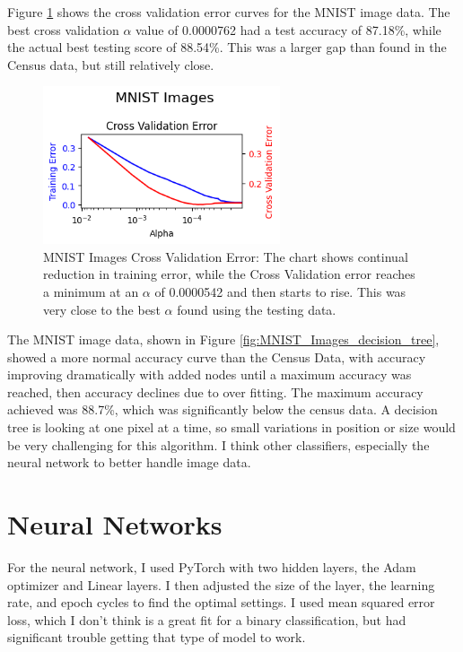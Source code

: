 \documentclass[letterpaper]{article} %
\begin{document}
Figure \ref{fig:MNIST_Images_decision_tree_cross_validation}  shows the cross validation error curves for the MNIST image data.  The best cross validation $\alpha$ value of 0.0000762 had a test accuracy of 87.18\%,  while the actual best testing score of 88.54\%.  This was a larger gap than found in the Census data, but still relatively close.

\begin{figure}[htb]
\centering
\includegraphics[width=2.75in]{figures/MNIST_Images_decision_tree_cross_validation.png}
\caption{MNIST Images Cross Validation Error:  The chart shows continual reduction in training error, while the Cross Validation error reaches a minimum at an $\alpha$ of 0.0000542 and then starts to rise.  This was very close to the best $\alpha$ found using the testing data. }
\label{fig:MNIST_Images_decision_tree_cross_validation}
\end{figure}

The MNIST image data, shown in Figure \ref{fig:MNIST_Images_decision_tree}, showed a more normal accuracy curve than the Census Data, with accuracy improving dramatically with added nodes until a maximum accuracy was reached, then accuracy declines due to over fitting.  The maximum accuracy achieved was 88.7\%, which was significantly below the census data.  A decision tree is looking at one pixel at a time, 
so small variations in position or size would be very challenging for this algorithm.  I think other classifiers, especially the neural network to better handle image data. 

\section{Neural Networks}
For the neural network, I used PyTorch with two hidden layers, the Adam optimizer and Linear layers.  I then adjusted the size of the layer, the learning rate, and epoch cycles to find the optimal settings.  I used mean squared error loss, which I don't think is a great fit for a binary classification, but had significant trouble getting that type of model to work.  
\end{document}
